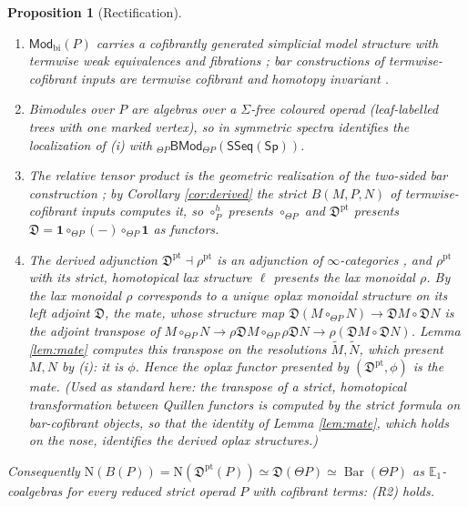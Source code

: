 \documentclass[11pt]{amsart}
\newtheorem{proposition}[subsection]{Proposition}
\theoremstyle{definition}
\theoremstyle{remark}
\newcommand{\Sp}{\mathsf{Sp}}
\newcommand{\SSeq}{\mathsf{SSeq}}
\newcommand{\BMod}{\mathsf{BMod}}
\newcommand{\unit}{\mathbf{1}}
\newcommand{\BarC}{\operatorname{Bar}}
\newcommand{\Fpt}{\mathfrak{D}}
\newcommand{\Fptpt}{\mathfrak{D}^{\mathrm{pt}}}
\newcommand{\Nfun}{\mathrm{N}}
\newcommand{\Th}{\Theta}
\begin{document}
\begin{proposition}[Rectification]\label{prop:c}
\begin{enumerate}[label=(\roman*),leftmargin=2em]
\item $\mathsf{Mod}_{\mathrm{bi}}(P)$ carries a cofibrantly generated simplicial model structure with termwise weak equivalences and fibrations \cite[Theorem 9.8]{AC1}; bar constructions of termwise-cofibrant inputs are termwise cofibrant and homotopy invariant \cite[Proposition 8.5, Corollary 8.8]{AC1}.
\item Bimodules over $P$ are algebras over a $\Sigma$-free coloured operad (leaf-labelled trees with one marked vertex), so \cite[Theorem 7.11]{PS18} in symmetric spectra identifies the localization of (i) with ${}_{\Th P}\BMod_{\Th P}(\SSeq(\Sp))$.
\item The relative tensor product is the geometric realization of the two-sided bar construction \cite[Construction 4.4.2.7, Proposition 4.4.2.8]{HA}; by Corollary \ref{cor:derived} the strict $B(M,P,N)$ of termwise-cofibrant inputs computes it, so $\circ_P^{h}$ presents $\circ_{\Th P}$ and $\Fptpt$ presents $\Fpt=\unit\circ_{\Th P}(-)\circ_{\Th P}\unit$ as functors.
\item The derived adjunction $\Fptpt\dashv\rho^{\mathrm{pt}}$ is an adjunction of $\infty$-categories \cite{MG16}, and $\rho^{\mathrm{pt}}$ with its strict, homotopical lax structure $\ell$ presents the lax monoidal $\rho$. By \cite[Proposition A, Corollary C]{HHLN} the lax monoidal $\rho$ corresponds to a unique oplax monoidal structure on its left adjoint $\Fpt$, the mate, whose structure map $\Fpt(M\circ_{\Th P}N)\to\Fpt M\circ\Fpt N$ is the adjoint transpose of $M\circ_{\Th P}N\to\rho\Fpt M\circ_{\Th P}\rho\Fpt N\to\rho(\Fpt M\circ\Fpt N)$. Lemma \ref{lem:mate} computes this transpose on the resolutions $\widetilde M,\widetilde N$, which present $M,N$ by (i): it is $\phi$. Hence the oplax functor presented by $(\Fptpt,\phi)$ is the mate. (Used as standard here: the transpose of a strict, homotopical transformation between Quillen functors is computed by the strict formula on bar-cofibrant objects, so that the identity of Lemma \ref{lem:mate}, which holds on the nose, identifies the derived oplax structures.)
\end{enumerate}
Consequently $\Nfun(B(P))=\Nfun(\Fptpt(P))\simeq\Fpt(\Th P)\simeq\BarC(\Th P)$ as $\mathbb{E}_1$-coalgebras for every reduced strict operad $P$ with cofibrant terms: (R2) holds.
\end{proposition}
\end{document}
